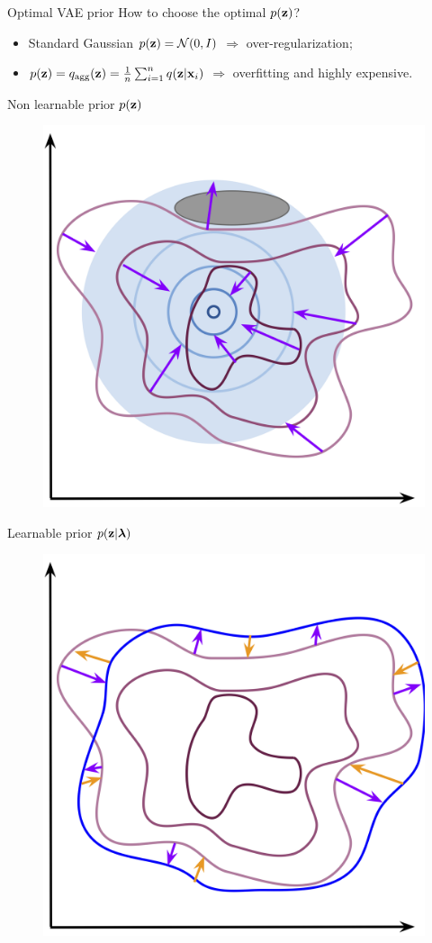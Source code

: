 \begin{frame}{Optimal VAE prior}
	How to choose the optimal $p(\mathbf{z})$?
	\begin{itemize}
		\item Standard Gaussian $p(\mathbf{z}) = \mathcal{N}(0, I)$ $\Rightarrow$ over-regularization;
		\item $p(\mathbf{z}) = q_{\text{agg}}(\mathbf{z}) = \frac{1}{n}\sum_{i=1}^n q(\mathbf{z} | \mathbf{x}_i)$ $\Rightarrow$ overfitting and highly expensive.
	\end{itemize}
	\vspace{-0.3cm}
	\begin{minipage}[t]{0.5\columnwidth}
		\begin{block}{Non learnable prior $p(\mathbf{z})$}
			\begin{figure}[h]
				\centering
				\includegraphics[width=0.8\linewidth]{figs/non_learnable_prior}
			\end{figure}
		\end{block}
	\end{minipage}%
	\begin{minipage}[t]{0.5\columnwidth}
		\begin{block}{Learnable prior $p(\mathbf{z} | \boldsymbol{\lambda})$}
			\begin{figure}[h]
				\centering
				\includegraphics[width=0.8\linewidth]{figs/learnable_prior}

\end{figure}
\end{block}
\end{minipage}
\end{frame}
